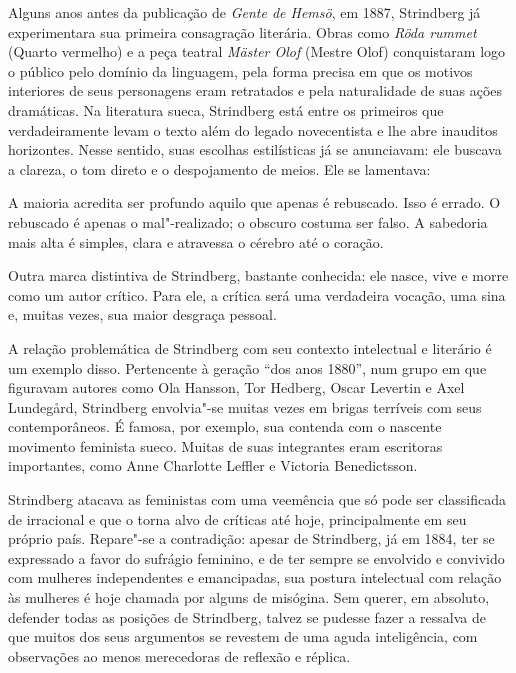 Alguns anos antes da publicação de \textit{Gente de Hemsö}, em 1887, Strindberg já experimentara
sua primeira consagração literária. Obras como
\textit{Röda rummet} (Quarto vermelho) e a peça teatral \textit{Mäster Olof} (Mestre Olof) 
conquistaram logo o público pelo domínio da linguagem, pela forma
precisa em que os motivos interiores de seus personagens eram
retratados e pela naturalidade de suas ações dramáticas. Na
literatura sueca, Strindberg está entre os primeiros que
verdadeiramente levam o texto além do legado novecentista
e lhe abre inauditos horizontes. Nesse sentido, suas
escolhas estilísticas já se anunciavam: ele buscava a clareza, o tom
direto e o despojamento de meios. Ele se lamentava: 

\begin{hedraquote}
A maioria acredita ser profundo aquilo que apenas é rebuscado. Isso é
errado. O rebuscado é apenas o mal"-realizado; o obscuro costuma ser
falso. A sabedoria mais alta é simples, clara e atravessa o cérebro até
o coração.
\end{hedraquote}


Outra marca distintiva de Strindberg, bastante conhecida: ele
nasce, vive e morre como um autor crítico. Para ele, a crítica será uma
verdadeira vocação, uma sina e, muitas vezes, sua maior desgraça pessoal. 

A relação problemática de Strindberg com seu contexto intelectual e
literário é um exemplo disso. Pertencente à geração “dos anos 1880”, 
num grupo em que figuravam autores como Ola Hansson, Tor Hedberg,
Oscar Levertin e Axel Lundegård, Strindberg envolvia"-se muitas vezes em
brigas terríveis com seus contemporâneos. É famosa, por exemplo, sua
contenda com o nascente movimento feminista sueco. Muitas de suas
integrantes eram escritoras importantes, como Anne Charlotte
Leffler e Victoria Benedictsson. 

Strindberg atacava as feministas com
uma veemência que só pode ser classificada de irracional e que o torna alvo de 
críticas até hoje, principalmente em seu próprio país. Repare"-se a contradição: apesar de
Strindberg, já em 1884, ter se expressado a favor do sufrágio feminino, e de ter sempre 
se envolvido e convivido com mulheres independentes e emancipadas, 
sua postura intelectual com relação às mulheres é
hoje chamada por alguns de misógina. Sem querer,
em absoluto, defender todas as posições de Strindberg, talvez se pudesse fazer a
ressalva de que muitos dos seus argumentos se revestem de uma aguda inteligência,
com observações ao menos merecedoras de reflexão e réplica.

